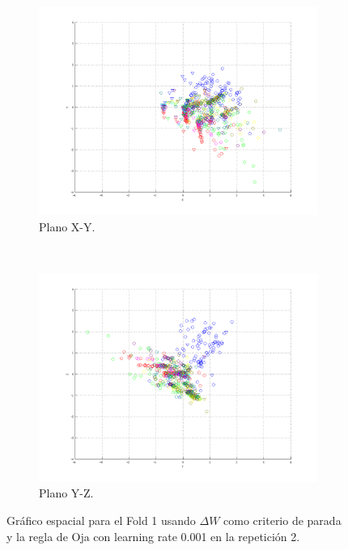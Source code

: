 \documentclass[informe.tex]{subfiles}
\begin{document}
\begin{figure}[H]
        \hspace*{-6.5cm}
        \begin{subfigure}[b]{0.49\textwidth}
                \includegraphics[width=\textwidth]{graficos/fold1_criterioParadap_reglaM_alpha0_rep2_2XY.png}
                \caption{Plano X-Y.}
        \end{subfigure}
        ~
        \begin{subfigure}[b]{0.49\textwidth}
                \includegraphics[width=\textwidth]{graficos/fold1_criterioParadap_reglaM_alpha0_rep2_3YZ.png}
                \caption{Plano Y-Z.}
        \end{subfigure}
	\restoregeometry
        \caption{Gráfico espacial para el Fold 1 usando $\Delta W$ como criterio de parada y la regla de Oja con learning rate 0.001 en la repetición 2.}
        \label{fig:fold1_criterioParadap_reglaM_alpha0_rep2}
	\end{figure}
      
\end{document}
